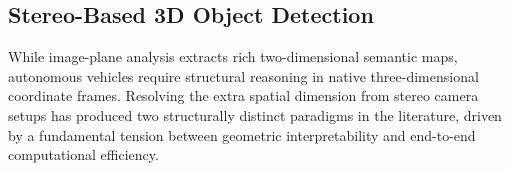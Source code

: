 \begin{table}[ht]
\centering
\caption{Comparison of major 2D object detection models on the COCO benchmark.}
\label{tab:detectors}
\renewcommand{\arraystretch}{1.6}
\small
{}
\end{table}

\subsection{Stereo-Based 3D Object Detection}

While image-plane analysis extracts rich two-dimensional semantic maps,
autonomous vehicles require structural reasoning in native three-dimensional
coordinate frames. Resolving the extra spatial dimension from stereo camera
setups has produced two structurally distinct paradigms in the literature, driven
by a fundamental tension between geometric interpretability and end-to-end
computational efficiency.

